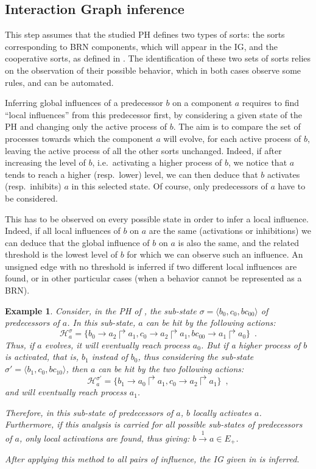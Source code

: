 \documentclass[11pt,a4paper,twoside]{epig}
\def\pref{\prettyref}
\newtheorem{example}{Example}{\itshape}{}
\newcommand{\PHh}{\mathcal{H}}
\newcommand{\PHfrappeA}{\rightarrow}
\newcommand{\PHfrappeB}{\Rsh}
\newcommand{\PHfrappe}[3]{#1\PHfrappeA#2\PHfrappeB#3}
\def\PHstate#1{\langle #1 \rangle}
\newcounter{la}
\newcommand{\ie}{i.e.\ }
\newcommand{\resp}{resp.\ }
\begin{document}
%
\subsection{Interaction Graph inference}\label{ssec:infer-IG}
This step assumes that the studied PH defines two types of sorts: the sorts corresponding to BRN components, which will appear in the IG, and the cooperative sorts, as defined in \pref{ssec:PH}.
The identification of these two sets of sorts relies on the observation of their possible behavior, which in both cases observe some rules, and can be automated.

Inferring global influences of a predecessor $b$ on a component $a$ requires to find “local influences” from this predecessor first, by considering a given state of the PH and changing only the active process of $b$.
The aim is to compare the set of processes towards which the component $a$ will evolve, for each active process of $b$, leaving the active process of all the other sorts unchanged.
Indeed, if after increasing the level of $b$, \ie activating a higher process of $b$, we notice that $a$ tends to reach a higher (\resp lower) level, we can then deduce that $b$ activates (\resp inhibits) $a$ in this selected state.
Of course, only predecessors of $a$ have to be considered.

This has to be observed on every possible state in order to infer a local influence.
Indeed, if all local influences of $b$ on $a$ are the same (activations or inhibitions) we can deduce that the global influence of $b$ on $a$ is also the same, and the related threshold is the lowest level of $b$ for which we can observe such an influence.
An unsigned edge with no threshold is inferred if two different local influences are found, or in other particular cases (when a behavior cannot be represented as a BRN).

\begin{example}
Consider, in the PH of \pref{fig:runningPH}, the sub-state $\sigma = \PHstate{b_0, c_0, bc_{00}}$ of predecessors of $a$.
In this sub-state, $a$ can be hit by the following actions:
$$\PHh_a^\sigma = \{\PHfrappe{b_0}{a_2}{a_1}, \PHfrappe{c_0}{a_2}{a_1}, \PHfrappe{bc_{00}}{a_1}{a_0}\} \enspace.$$
Thus, if $a$ evolves, it will eventually reach process $a_0$.
But if a higher process of $b$ is activated, that is, $b_1$ instead of $b_0$, thus considering the sub-state $\sigma' = \PHstate{b_1, c_0, bc_{10}}$,
then $a$ can be hit by the two following actions:
$$\PHh_a^{\sigma'} = \{\PHfrappe{b_1}{a_0}{a_1}, \PHfrappe{c_0}{a_2}{a_1}\} \enspace,$$
and will eventually reach process $a_1$.

Therefore, in this sub-state of predecessors of $a$, $b$ locally activates $a$.
Furthermore, if this analysis is carried for all possible sub-states of predecessors of $a$, only local activations are found,
thus giving: $b \xrightarrow{1} a \in E_+$.

After applying this method to all pairs of influence, the IG given in \pref{fig:runningBRN} is inferred.
\end{example}
\end{document}
